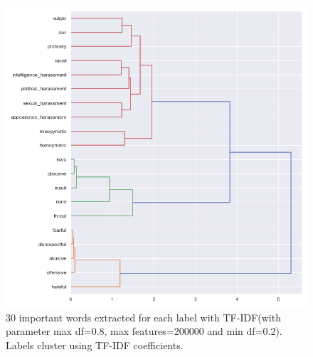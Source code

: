 \documentclass[fleqn,moreauthors,10pt]{ds_report}
\begin{document}
\begin{figure}
    \centering
    \includegraphics[width=\columnwidth]{fig/tf-idf_cluster.png}
    \caption{30 important words extracted for each label with TF-IDF(with parameter max df=0.8, max features=200000 and min df=0.2). Labels cluster using TF-IDF coefficients.}
    \label{fig:hierarchical_tfidf}
\end{figure}
\end{document}
